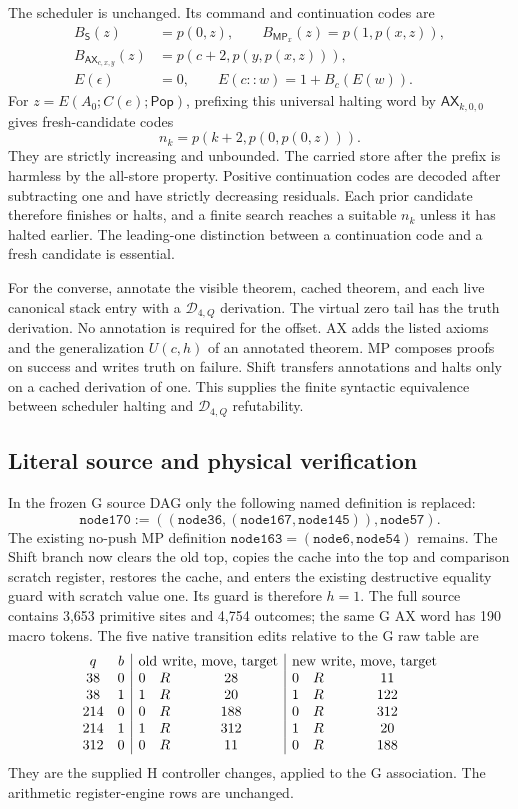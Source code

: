 The scheduler is unchanged. Its command and continuation codes are
\begin{align*}
 B_{\mathsf S}(z)&=p(0,z),\qquad
 B_{\mathsf{MP}_x}(z)=p(1,p(x,z)),\\
 B_{\mathsf{AX}_{c,x,y}}(z)&=p(c+2,p(y,p(x,z))),\\
 E(\epsilon)&=0,\qquad E(c::w)=1+B_c(E(w)).
\end{align*}
For $z=E(A_0;C(e);\mathsf{Pop})$, prefixing this universal halting word
by $\mathsf{AX}_{k,0,0}$ gives fresh-candidate codes
\[
                       n_k=p(k+2,p(0,p(0,z))).
\]
They are strictly increasing and unbounded. The carried store after the
prefix is harmless by the all-store property. Positive continuation codes
are decoded after subtracting one and have strictly decreasing residuals.
Each prior candidate therefore finishes or halts, and a finite search
reaches a suitable $n_k$ unless it has halted earlier. The leading-one
distinction between a continuation code and a fresh candidate is essential.

For the converse, annotate the visible theorem, cached theorem, and each
live canonical stack entry with a $\mathcal D_{4,Q}$ derivation. The virtual
zero tail has the truth derivation. No annotation is required for the offset.
AX adds the listed axioms and the generalization $U(c,h)$ of an annotated
theorem. MP composes proofs on success and writes truth on failure. Shift
transfers annotations and halts only on a cached derivation of one.
This supplies the finite syntactic equivalence between scheduler halting
and $\mathcal D_{4,Q}$ refutability.

\subsection{Literal source and physical verification}

In the frozen G source DAG only the following named definition is replaced:
\[
 \texttt{node170}:=
       ((\texttt{node36},(\texttt{node167},\texttt{node145})),\texttt{node57}).
\]
The existing no-push MP definition
$\texttt{node163}=(\texttt{node6},\texttt{node54})$ remains.
The Shift branch now clears the old top, copies the cache into the top and
comparison scratch register, restores the cache, and enters the existing
destructive equality guard with scratch value one. Its guard is therefore
$h=1$. The full source contains 3,653 primitive sites and 4,754 outcomes;
the same G AX word has 190 macro tokens. The five native transition edits
relative to the G raw table are
\[
\begin{array}{cc|ccc|ccc}
q&b&\multicolumn{3}{c|}{\text{old write, move, target}}&
      \multicolumn{3}{c}{\text{new write, move, target}}\\
38&0&0&R&28&0&R&11\\
38&1&1&R&20&1&R&122\\
214&0&0&R&188&0&R&312\\
214&1&1&R&312&1&R&20\\
312&0&0&R&11&0&R&188
\end{array}
\]
They are the supplied H controller changes, applied to the G association.
The arithmetic register-engine rows are unchanged.


